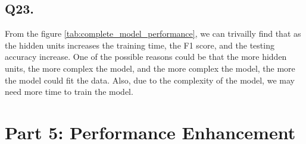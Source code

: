 \documentclass{article}
\begin{document}
\subsection*{Q23.}

From the figure \ref{tab:complete_model_performance}, we can trivailly find that as the hidden units increases the training time, the F1 score, and the testing accuracy increase.
One of the possible reasons could be that the more hidden units, the more complex the model, and the more complex the model, the more the model could fit the data.
Also, due to the complexity of the model, we may need more time to train the model.

\newpage

\section*{Part 5: Performance Enhancement}
\end{document}

